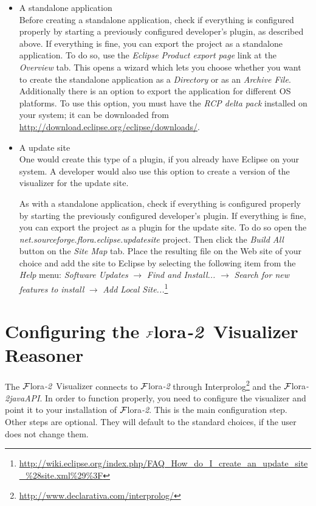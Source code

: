 \documentclass[a4paper,11pt]{article}
\newcommand{\FLORA}{{\mbox{\sc ${\cal F}${lora}\rm\emph{-2}}}\xspace}
\newcommand{\FVIZ}{{\mbox{\sc ${\cal F}${lora}\rm\emph{-2} {Visualizer}}}\xspace}
\begin{document}
\begin{enumerate}
\begin{itemize}
\item A standalone application\\
  Before creating a standalone application, check if everything is
  configured properly by starting a previously configured developer's
  plugin, as described above.  If everything is fine, you can export the
  project as a standalone application.  To do so, use the \emph{Eclipse
    Product export page} link at the \emph{Overview} tab.  This opens a
  wizard which lets you choose whether you want to create the standalone
  application as a
  \emph{Directory} or as an \emph{Archive File}.\\
  Additionally there is an option to export the application for different
  OS platforms.  To use this option, you must have the \emph{RCP delta
    pack} installed on your system; it can be downloaded from
  \url{http://download.eclipse.org/eclipse/downloads/}.
  
\item A update site\\
  One would create this type of a plugin, if you already have Eclipse on
  your system. A developer would also use this option to create a version
  of the visualizer for the update site.

  As with a standalone application, check if everything is configured
  properly by starting the previously configured developer's plugin.
  If everything is fine, you can export the project as a plugin for the update
  site. To do so open the \emph{net.sourceforge.flora.eclipse.updatesite}
  project. Then click the \emph{Build All} button on the \emph{Site Map}
  tab. Place the resulting file on the Web site of your choice and add the
  site to Eclipse by selecting the following item from the \emph{Help}
  menu: \emph{Software Updates} $\rightarrow$
  \emph{Find and Install...}  $\rightarrow$ \emph{Search for new features
    to install} $\rightarrow$ \emph{Add Local Site...}\footnote{
    \url{http://wiki.eclipse.org/index.php/FAQ\_How\_do\_I\_create\_an\_update\_site\_\%28site.xml\%29\%3F}
  }

\end{itemize}


\end{enumerate}

\section{Configuring the \FVIZ Reasoner}
\label{sec:reasoner}

The \FVIZ connects to \FLORA through
Interprolog\footnote{\url{http://www.declarativa.com/interprolog/}} and the
\FLORA \emph{javaAPI}. In order to function properly, you need to configure
the visualizer and point it to your installation of \FLORA. This is the
main configuration step. Other steps are optional. They will default to the
standard choices, if the user does not change them.
\end{document}
